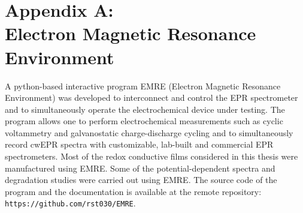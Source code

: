 \chapter*{Appendix A:\\Electron Magnetic Resonance Environment}
A python-based interactive program EMRE (Electron Magnetic Resonance Environment) was developed to interconnect and control the EPR spectrometer and to simultaneously operate the electrochemical device under testing. The program allows one to perform electrochemical measurements such as cyclic voltammetry and galvanostatic charge-discharge cycling and to simultaneously record cwEPR spectra with customizable, lab-built and commercial EPR spectrometers. Most of the redox conductive films considered in this thesis were manufactured using EMRE. Some of the potential-dependent spectra and degradation studies were carried out using EMRE. The source code of the program and the documentation is available at the remote repository:\\ \texttt{https://github.com/rst030/EMRE}.\\